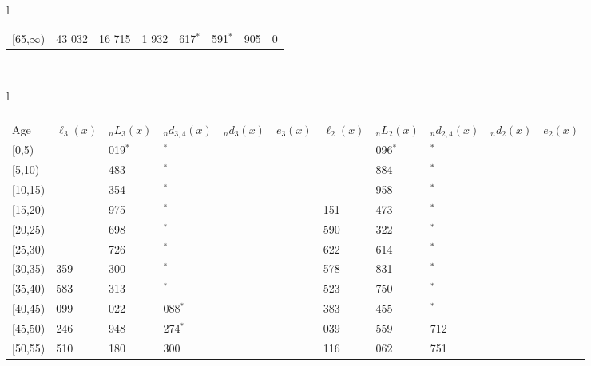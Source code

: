 \documentclass[
]{article}
\begin{document}
\begin{table}
\begin{tabular}[t]{l}
\begin{tabular}
{}[65,$\infty$) & 43 032 & 16 715 & 1 932 & 617$^{*}$ & 591$^{*}$ & 905 & 0\\
\end{tabular}\\
\end{tabular}
\centering
\begin{tabular}[t]{l}
\hline
\begin{tabular}{>{\raggedright\arraybackslash}p{.43in}>{\raggedleft\arraybackslash}p{.42in}>{\raggedleft\arraybackslash}p{.42in}>{\raggedleft\arraybackslash}p{.42in}>{\raggedleft\arraybackslash}p{.42in}>{\raggedleft\arraybackslash}p{.42in}>{\raggedleft\arraybackslash}p{.42in}>{\raggedleft\arraybackslash}p{.42in}>{\raggedleft\arraybackslash}p{.42in}>{\raggedleft\arraybackslash}p{.42in}>{\raggedleft\arraybackslash}p{.42in}}
\toprule
\multicolumn{1}{c}{ } & \multicolumn{5}{c}{(2) Lost mother only} & \multicolumn{5}{c}{(3) Lost father only} \\
\cmidrule(l{3pt}r{3pt}){2-6} \cmidrule(l{3pt}r{3pt}){7-11}
Age & $\ell_{3}(x)$ & ${}_nL_{3}(x)$ & ${}_nd_{3,4}(x)$ & ${}_nd_{3}(x)$ & $e_{3}(x)$ & $\ell_{2}(x)$ & ${}_nL_{2}(x)$ & ${}_nd_{2,4}(x)$ & ${}_nd_{2}(x)$ & $e_{2}(x)$\\
\midrule
{}[0,5) & 0 & 1 019$^{*}$ & 0$^{*}$ & 1 & 3 & 0 & 1 096$^{*}$ & 0$^{*}$ & 1 & 9\\
{}[5,10) & -1 & 2 483 & 0$^{*}$ & 0 & 3 & 175 & 2 884 & 126$^{*}$ & 0 & 9\\
{}[10,15) & -2 & 3 354 & 0$^{*}$ & 1 & 3 & 281 & 9 958 & 99$^{*}$ & 2 & 9\\
{}[15,20) & -2 & 5 975 & 0$^{*}$ & 3 & 3 & 1 151 & 15 473 & 0$^{*}$ & 9 & 9\\
{}[20,25) & -6 & 7 698 & 0$^{*}$ & 8 & 3 & 2 590 & 21 322 & 0$^{*}$ & 23 & 8\\
\addlinespace
{}[25,30) & 721 & 15 726 & 0$^{*}$ & 22 & 3 & 3 622 & 32 614 & 236$^{*}$ & 46 & 8\\
{}[30,35) & 1 359 & 22 300 & 0$^{*}$ & 40 & 3 & 4 578 & 45 831 & 323$^{*}$ & 82 & 8\\
{}[35,40) & 2 583 & 27 313 & 687$^{*}$ & 60 & 2 & 7 523 & 64 750 & 565$^{*}$ & 143 & 8\\
{}[40,45) & 4 099 & 31 022 & 1 088$^{*}$ & 86 & 2 & 11 383 & 87 455 & 725$^{*}$ & 243 & 7\\
{}[45,50) & 4 246 & 43 948 & 1 274$^{*}$ & 168 & 2 & 14 039 & 112 559 & 3 712 & 431 & 6\\
\addlinespace
{}[50,55) & 5 510 & 48 180 & 2 300 & 270 & 2 & 15 116 & 125 062 & 6 751 & 701 & 5\\

\end{tabular}
\end{tabular}
\end{table}
\end{document}
